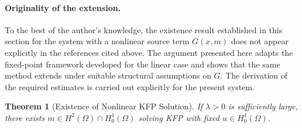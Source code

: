\documentclass[11pt]{article}
\numberwithin{equation}{section}
\newtheorem{theorem}{Theorem}[section]
\theoremstyle{definition}
\theoremstyle{remark}
\newcommand{\Honez}{H_0^1(\Omega)}
\begin{document}
\paragraph{Originality of the extension.}
To the best of the author's knowledge, the existence result established in this
section for the system with a nonlinear source term $G(x,m)$ does not appear
explicitly in the references cited above. The argument presented here adapts
the fixed-point framework developed for the linear case and shows that the same
method extends under suitable structural assumptions on $G$. The derivation of
the required estimates is carried out explicitly for the present system.

\begin{theorem}[Existence of Nonlinear KFP Solution]
\label{thm:existence2}  
If $\lambda>0$ is sufficiently large, there exists $m\in H^2(\Omega)\cap \Honez$ solving KFP with fixed $u \in \Honez$.
\end{theorem}
\end{document}
